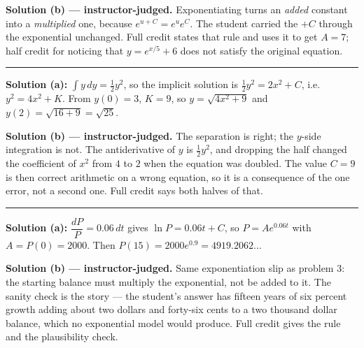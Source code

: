 \documentclass[12pt]{article}
\begin{document}
\textbf{Solution (b) --- instructor-judged.} Exponentiating turns an \emph{added} constant into a \emph{multiplied} one, because $e^{u+C} = e^{u}e^{C}$. The student carried the $+C$ through the exponential unchanged. Full credit states that rule and uses it to get $A = 7$; half credit for noticing that $y = e^{x/5} + 6$ does not satisfy the original equation.

\vspace{0.2cm}\noindent\rule{\linewidth}{0.2pt}\vspace{0.2cm}


\textbf{Solution (a):} $\displaystyle\int y\,dy = \tfrac{1}{2}y^2$, so the implicit solution is $\tfrac{1}{2}y^2 = 2x^2 + C$, i.e. $y^2 = 4x^2 + K$. From $y(0) = 3$, $K = 9$, so $y = \sqrt{4x^2 + 9}$ and $y(2) = \sqrt{16 + 9} = \sqrt{25}$. 

\textbf{Solution (b) --- instructor-judged.} The separation is right; the $y$-side integration is not. The antiderivative of $y$ is $\tfrac12 y^2$, and dropping the half changed the coefficient of $x^2$ from $4$ to $2$ when the equation was doubled. The value $C = 9$ is then correct arithmetic on a wrong equation, so it is a consequence of the one error, not a second one. Full credit says both halves of that.

\vspace{0.2cm}\noindent\rule{\linewidth}{0.2pt}\vspace{0.2cm}


\textbf{Solution (a):} $\dfrac{dP}{P} = 0.06\,dt$ gives $\ln P = 0.06t + C$, so $P = Ae^{0.06t}$ with $A = P(0) = 2000$. Then $P(15) = 2000e^{0.9} = 4919.2062\ldots$ 

\textbf{Solution (b) --- instructor-judged.} Same exponentiation slip as problem 3: the starting balance must multiply the exponential, not be added to it. The sanity check is the story --- the student's answer has fifteen years of six percent growth adding about two dollars and forty-six cents to a two thousand dollar balance, which no exponential model would produce. Full credit gives the rule and the plausibility check.
\end{document}
